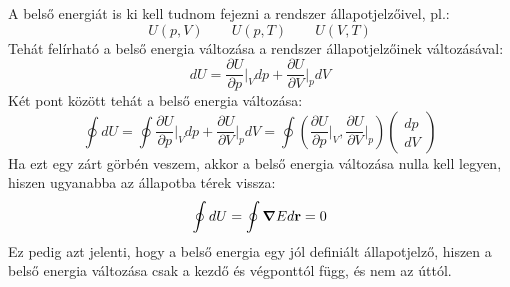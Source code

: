 \documentclass[a4paper,12pt]{article}
\begin{document}
A belső energiát is ki kell tudnom fejezni a rendszer állapotjelzőivel, pl.:
\begin{equation}
    U(p, V) \qquad U(p, T) \qquad U(V, T)
\end{equation}
Tehát felírható a belső energia változása a rendszer állapotjelzőinek változásával:
\begin{equation}
    dU = \frac{\partial U}{\partial p}\bigg|_{V} dp + \frac{\partial U}{\partial V}\bigg|_{p} dV
\end{equation}
Két pont között tehát a belső energia változása:
\begin{equation}
    \oint dU = \oint \frac{\partial U}{\partial p}\bigg|_{V} dp + \frac{\partial U}{\partial V}\bigg|_{p} dV = \oint \left(\frac{\partial U}{\partial p}\bigg|_{V}, \frac{\partial U}{\partial V}\bigg|_{p}\right)
    \begin{pmatrix}
        dp \\
        dV
    \end{pmatrix}
\end{equation}
Ha ezt egy zárt görbén veszem, akkor a belső energia változása nulla kell legyen, hiszen ugyanabba az állapotba térek vissza:
\begin{equation}
    \oint dU = \oint \boldsymbol{\nabla} E d \bold{r} = 0
\end{equation}
Ez pedig azt jelenti, hogy a belső energia egy jól definiált állapotjelző, hiszen a belső energia változása csak a kezdő és végponttól függ, és nem az úttól.
\end{document}
